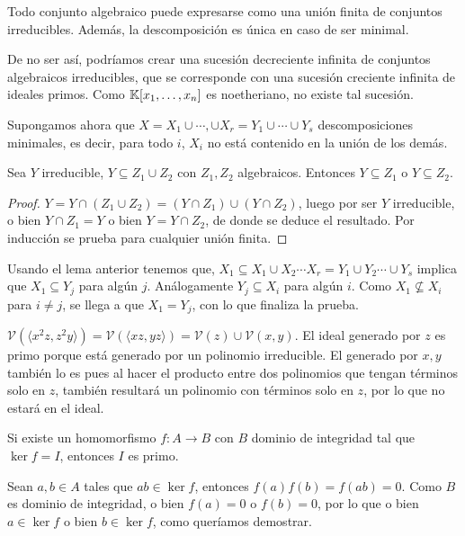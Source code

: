 \documentclass[ACGA.tex]{subfiles}
\begin{document}
\begin{prop}
Todo conjunto algebraico puede expresarse como una unión finita de conjuntos irreducibles. Además, la descomposición es única en caso de ser minimal.
\end{prop}
\begin{dem}
De no ser así, podríamos crear una sucesión decreciente infinita de conjuntos algebraicos irreducibles, que se corresponde con una sucesión creciente infinita de ideales primos. Como $\mathbb{K}[x_1,\dotsc,x_{n}]$ es noetheriano, no existe tal sucesión.

Supongamos ahora que $X=X_1\cup\cdots, \cup X_r=Y_1\cup\cdots\cup Y_s$ descomposiciones minimales, es decir, para todo $i$, $X_i$ no está contenido en la unión de los demás. 
\begin{lemma}
Sea $Y$ irreducible, $Y\subseteq Z_1\cup Z_2$ con $Z_1,Z_2$ algebraicos. Entonces $Y\subseteq Z_1$ o $Y\subseteq Z_2$. 
\end{lemma}
\begin{proof}
$Y=Y\cap( Z_1\cup Z_2)=(Y\cap Z_1)\cup(Y\cap Z_2)$, luego por ser $Y$ irreducible, o bien $Y\cap Z_1=Y$ o bien $Y=Y\cap Z_2$, de donde se deduce el resultado. Por inducción se prueba para cualquier unión finita.
\end{proof}
Usando el lema anterior tenemos que, $X_1\subseteq X_1\cup X_2\cdots X_r=Y_1\cup Y_2\cdots\cup Y_s$ implica que $X_1\subseteq Y_j$ para algún $j$. Análogamente $Y_j\subseteq X_i$ para algún $i$. Como $X_1\not\subseteq X_i$ para $i\neq j$, se llega a que $X_1=Y_j$, con lo que finaliza la prueba.\QED


\end{dem}

\begin{ej}
$\mathcal{V}(\langle x^2z,z^2y\rangle)=\mathcal{V}(\langle xz,yz\rangle)=\mathcal{V}(z)\cup\mathcal{V}(x,y)$. El ideal generado por $z$ es primo porque está generado por un polinomio irreducible. El generado por $x,y$ también lo es pues al hacer el producto entre dos polinomios que tengan términos solo en $z$, también resultará un polinomio con términos solo en $z$, por lo que no estará en el ideal.
\end{ej}

\begin{prop}
Si existe un homomorfismo $f:A\to B$ con $B$ dominio de integridad tal que $\ker{f}=I$, entonces $I$ es primo.
\end{prop}

\begin{dem}
Sean $a,b\in A$ tales que $ab\in\ker{f}$, entonces $f(a)f(b)=f(ab)=0$. Como $B$ es dominio de integridad, o bien $f(a)=0$ o $f(b)=0$, por lo que o bien $a\in\ker{f}$ o bien $b\in\ker{f}$, como queríamos demostrar.\QED
\end{dem}
\end{document}
